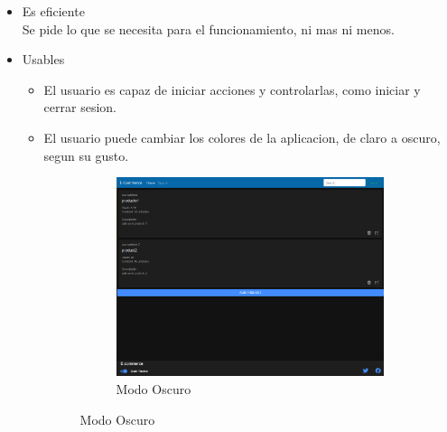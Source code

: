 \documentclass{article}
\begin{document}
\begin{itemize}
   \item Es eficiente\\
   \phantom{ab}Se pide lo que se necesita para el funcionamiento, ni mas ni menos.
   \item Usables
   \begin{itemize}
    \item El usuario es capaz de iniciar acciones y controlarlas, como iniciar y cerrar sesion.
    \item El usuario puede cambiar los colores de la aplicacion, de claro a oscuro, segun su gusto.
    \begin{figure}[h]
        \ContinuedFloat
        \centering
        \begin{subfigure}[h]{0.45\textwidth}
        \includegraphics[scale=0.25]{usability/darkTheme.png}
        \caption{Modo Oscuro}
        \label{Fig:DarkTheme}
        \end{subfigure}
        

\end{figure}
\end{itemize}
\end{itemize}
\end{document}
